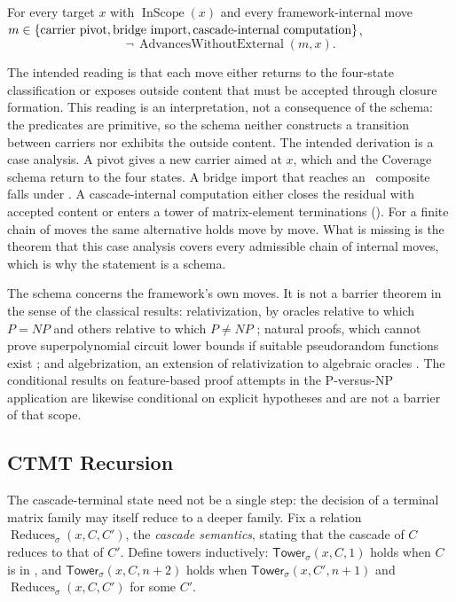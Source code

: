 \begin{schema}\label{thm:attack-foreclosure-v4}
For every target \(x\) with \(\operatorname{InScope}(x)\) and every
framework-internal move
\(m\in\{\mbox{carrier pivot},\mbox{bridge import},\mbox{cascade-internal computation}\}\),
\[
  \neg\,\operatorname{AdvancesWithoutExternal}(m,x).
\]
\end{schema}

The intended reading is that each move either returns to the
four-state classification or exposes outside content that must be
accepted through closure formation.  This reading is an interpretation,
not a consequence of the schema: the predicates are primitive, so the
schema neither constructs a transition between carriers nor exhibits
the outside content.  The intended derivation is a case analysis.  A
pivot gives a new carrier aimed at \(x\), which
 and the Coverage schema return to the four
states.  A bridge import that reaches an \Xequiv\ composite falls under
.  A cascade-internal computation either
closes the residual with accepted content or enters a tower of
matrix-element terminations ().  For a finite
chain of moves the same alternative holds move by move.  What is
missing is the theorem that this case analysis covers every admissible
chain of internal moves, which is why the statement is a schema.

The schema concerns the framework's own moves.  It is not a barrier
theorem in the sense of the classical results: relativization, by
oracles relative to which \(P=NP\) and others relative to which
\(P\neq NP\) \cite{BakerGillSolovay1975Relativization}; natural proofs,
which cannot prove superpolynomial circuit lower bounds if suitable
pseudorandom functions exist \cite{RazborovRudich1997NaturalProofs};
and algebrization, an extension of relativization to algebraic oracles
\cite{AaronsonWigderson2009Algebrization}.  The conditional results on feature-based proof
attempts in the P-versus-NP application \cite{Tsiokos2026PvNP} are
likewise conditional on explicit hypotheses and are not a barrier of
that scope.

\subsection{CTMT Recursion}\label{sec:foreclosure:ctmt-recursion}

The cascade-terminal state need not be a single step: the decision of a
terminal matrix family may itself reduce to a deeper family.  Fix a
relation \(\operatorname{Reduces}_{\sigma}(x,C,C')\), the \emph{cascade
semantics}, stating that the cascade of \(C\) reduces to that of \(C'\).
Define towers inductively: \(\mathsf{Tower}_{\sigma}(x,C,1)\) holds when
\(C\) is in \CRECTMT, and \(\mathsf{Tower}_{\sigma}(x,C,n+2)\) holds when
\(\mathsf{Tower}_{\sigma}(x,C',n+1)\) and \(\operatorname{Reduces}_{\sigma}(x,C,C')\)
for some \(C'\).

